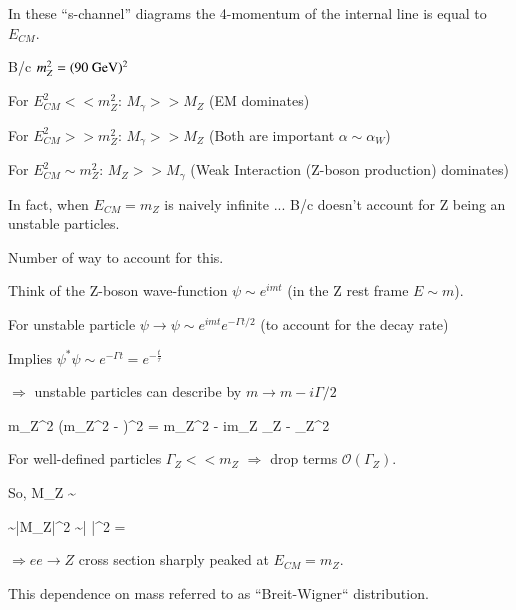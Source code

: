 {In these ``s-channel'' diagrams the 4-momentum of the internal line is equal to $E_{CM}$.

B/c $m_Z^2 = (90\ \textrm{GeV})^2$
\bi
\item[-] For $E_{CM}^2 << m_Z^2$:  $M_\gamma >> M_Z$  (EM dominates)
\item[-] For $E_{CM}^2 >> m_Z^2$:  $M_\gamma >> M_Z$  (Both are important $\alpha \sim \alpha_W$)
\item[-] For $E_{CM}^2 \sim m_Z^2$:  $M_Z >> M_\gamma$  (Weak Interaction (Z-boson production) dominates)
\ei

In fact, when $E_{CM} = m_Z$ is naively infinite ...  B/c doesn't account for Z being an unstable particles. 

Number of way to account for this. 

Think of the Z-boson wave-function $\psi \sim e^{imt}$ (in the Z rest frame $E\sim m$).

For unstable particle $\psi \rightarrow \psi \sim e^{imt} e^{-\Gamma t/2}$ (to account for the decay rate)

Implies $\psi^*\psi \sim e^{-\Gamma t} = e^{-\frac{t}{\tau}} $

$\Rightarrow$ unstable particles can describe by $m \rightarrow m- i\Gamma/2$

\be
m_Z^2 \rightarrow \left(m_Z^2 - \right)^2 = m_Z^2 - im_Z \Gamma_Z -  \Gamma_Z^2
\ee

For well-defined particles $\Gamma_Z << m_Z$ $\Rightarrow $ drop terms $\mathcal{O}(\Gamma_Z)$.

So,
\be
M_Z \sim {}
\ee

\be
\sigma \sim |M_Z|^2 \sim \left|  \right|^2 = 
\ee

$\Rightarrow ee\rightarrow Z$ cross section sharply peaked at $E_{CM} = m_Z$.

This dependence on mass referred to as ``Breit-Wigner`` distribution.\\

}
